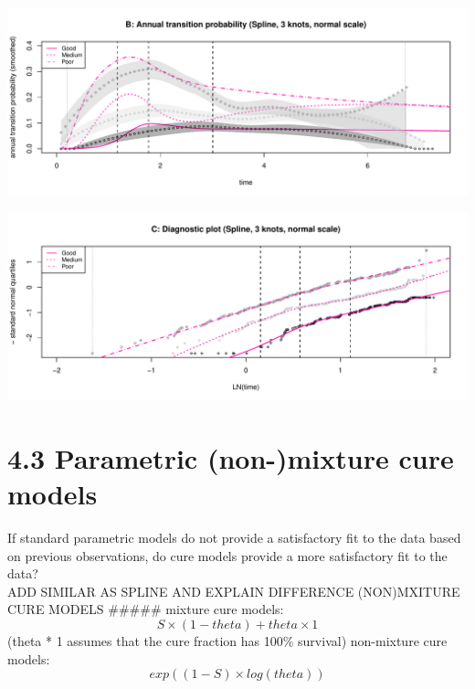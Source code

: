 \documentclass[
]{article}
\begin{document}
\begin{flushleft}\includegraphics[height=0.25\textheight]{Images/spline_norm3-2} \end{flushleft}

\begin{flushleft}\includegraphics[height=0.25\textheight]{Images/spline_norm3-3} \end{flushleft}

\clearpage

\hypertarget{parametric-non-mixture-cure-models}{%
\section{4.3 Parametric (non-)mixture cure
models}\label{parametric-non-mixture-cure-models}}

If standard parametric models do not provide a satisfactory fit to the
data based on previous observations, do cure models provide a more
satisfactory fit to the data?\\
ADD SIMILAR AS SPLINE AND EXPLAIN DIFFERENCE (NON)MXITURE CURE MODELS
\#\#\#\#\# mixture cure models: \[S × (1 - theta) + theta × 1\] (theta *
1 assumes that the cure fraction has 100\% survival) non-mixture cure
models: \[exp((1-S) × log(theta))\]
\end{document}
